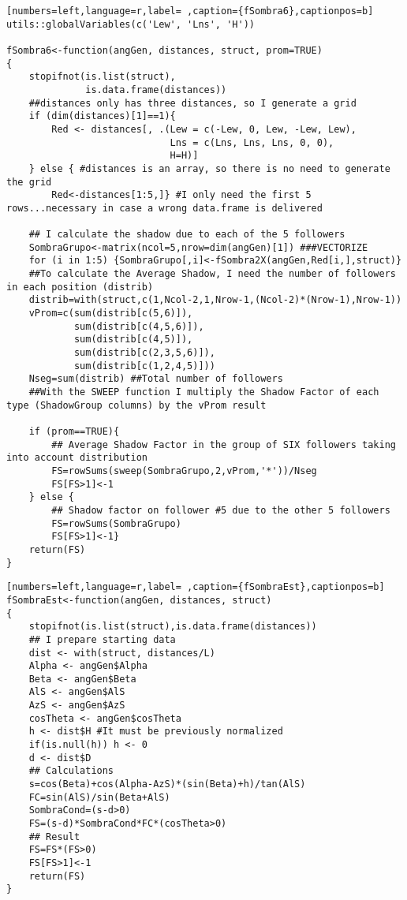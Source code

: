 \begin{lstlisting}[numbers=left,language=r,label= ,caption={fSombra6},captionpos=b]
utils::globalVariables(c('Lew', 'Lns', 'H'))

fSombra6<-function(angGen, distances, struct, prom=TRUE)
{
    stopifnot(is.list(struct),
              is.data.frame(distances))
    ##distances only has three distances, so I generate a grid
    if (dim(distances)[1]==1){ 
        Red <- distances[, .(Lew = c(-Lew, 0, Lew, -Lew, Lew),
                             Lns = c(Lns, Lns, Lns, 0, 0),
                             H=H)]
    } else { #distances is an array, so there is no need to generate the grid
        Red<-distances[1:5,]} #I only need the first 5 rows...necessary in case a wrong data.frame is delivered

    ## I calculate the shadow due to each of the 5 followers
    SombraGrupo<-matrix(ncol=5,nrow=dim(angGen)[1]) ###VECTORIZE
    for (i in 1:5) {SombraGrupo[,i]<-fSombra2X(angGen,Red[i,],struct)}
    ##To calculate the Average Shadow, I need the number of followers in each position (distrib)
    distrib=with(struct,c(1,Ncol-2,1,Nrow-1,(Ncol-2)*(Nrow-1),Nrow-1)) 
    vProm=c(sum(distrib[c(5,6)]),
            sum(distrib[c(4,5,6)]),
            sum(distrib[c(4,5)]),
            sum(distrib[c(2,3,5,6)]),
            sum(distrib[c(1,2,4,5)]))
    Nseg=sum(distrib) ##Total number of followers
    ##With the SWEEP function I multiply the Shadow Factor of each type (ShadowGroup columns) by the vProm result

    if (prom==TRUE){
        ## Average Shadow Factor in the group of SIX followers taking into account distribution
        FS=rowSums(sweep(SombraGrupo,2,vProm,'*'))/Nseg
        FS[FS>1]<-1
    } else {		
        ## Shadow factor on follower #5 due to the other 5 followers
        FS=rowSums(SombraGrupo)
        FS[FS>1]<-1}
    return(FS)
}
\end{lstlisting}
\begin{lstlisting}[numbers=left,language=r,label= ,caption={fSombraEst},captionpos=b]
fSombraEst<-function(angGen, distances, struct)
{
    stopifnot(is.list(struct),is.data.frame(distances))
    ## I prepare starting data
    dist <- with(struct, distances/L)
    Alpha <- angGen$Alpha
    Beta <- angGen$Beta
    AlS <- angGen$AlS
    AzS <- angGen$AzS
    cosTheta <- angGen$cosTheta
    h <- dist$H #It must be previously normalized
    if(is.null(h)) h <- 0
    d <- dist$D                   
    ## Calculations
    s=cos(Beta)+cos(Alpha-AzS)*(sin(Beta)+h)/tan(AlS)
    FC=sin(AlS)/sin(Beta+AlS)
    SombraCond=(s-d>0)
    FS=(s-d)*SombraCond*FC*(cosTheta>0)
    ## Result
    FS=FS*(FS>0)
    FS[FS>1]<-1
    return(FS)
}
\end{lstlisting}
